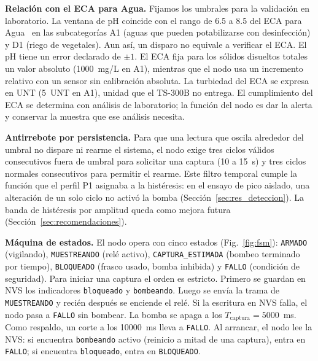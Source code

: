 \textbf{Relación con el ECA para Agua.} Fijamos los umbrales para la validación en laboratorio. La ventana de pH coincide con el rango de 6.5 a 8.5 del ECA para Agua~\cite{eca2017} en las subcategorías A1 (aguas que pueden potabilizarse con desinfección) y D1 (riego de vegetales). Aun así, un disparo no equivale a verificar el ECA. El pH tiene un error declarado de $\pm 1$. El ECA fija para los sólidos disueltos totales un valor absoluto (1000~mg/L en A1), mientras que el nodo usa un incremento relativo con un sensor sin calibración absoluta. La turbiedad del ECA se expresa en UNT (5~UNT en A1), unidad que el TS-300B no entrega. El cumplimiento del ECA se determina con análisis de laboratorio; la función del nodo es dar la alerta y conservar la muestra que ese análisis necesita.

\textbf{Antirrebote por persistencia.} Para que una lectura que oscila alrededor del umbral no dispare ni rearme el sistema, el nodo exige tres ciclos válidos consecutivos fuera de umbral para solicitar una captura (10 a 15~s) y tres ciclos normales consecutivos para permitir el rearme. Este filtro temporal cumple la función que el perfil P1 asignaba a la histéresis: en el ensayo de pico aislado, una alteración de un solo ciclo no activó la bomba (Sección~\ref{sec:res_deteccion}). La banda de histéresis por amplitud queda como mejora futura (Sección~\ref{sec:recomendaciones}).

\textbf{Máquina de estados.} El nodo opera con cinco estados (Fig.~\ref{fig:fsm}): \texttt{ARMADO} (vigilando), \texttt{MUESTREANDO} (relé activo), \texttt{CAPTURA\_ESTIMADA} (bombeo terminado por tiempo), \texttt{BLOQUEADO} (frasco usado, bomba inhibida) y \texttt{FALLO} (condición de seguridad). Para iniciar una captura el orden es estricto. Primero se guardan en NVS los indicadores \texttt{bloqueado} y \texttt{bombeando}. Luego se envía la trama de \texttt{MUESTREANDO} y recién después se enciende el relé. Si la escritura en NVS falla, el nodo pasa a \texttt{FALLO} sin bombear. La bomba se apaga a los $T_{\text{captura}} = 5000$~ms. Como respaldo, un corte a los 10000~ms lleva a \texttt{FALLO}. Al arrancar, el nodo lee la NVS: si encuentra \texttt{bombeando} activo (reinicio a mitad de una captura), entra en \texttt{FALLO}; si encuentra \texttt{bloqueado}, entra en \texttt{BLOQUEADO}.

